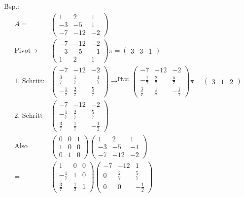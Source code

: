 Bsp.:
\begin{align*}
A= 
&\begin{pmatrix}
1  &  2  & 1 \\
-3 & -5  & 1 \\
-7 & -12 & -2
\end{pmatrix} \\
\text{Pivot} \rightarrow
&\begin{pmatrix}
-7 & -12 & -2 \\
-3 & -5  & -1 \\
1 & 2 & 1
\end{pmatrix}
 \pi = \begin{pmatrix} 3 & 3 & 1\end{pmatrix} \\
\text{1. Schritt:} 
&\begin{pmatrix}
-7           & -12         &           -2 \\
\frac{3}{7}  & \frac{1}{7} & -\frac{1}{7} \\
-\frac{1}{7} & \frac{2}{7} & \frac{5}{7}  
\end{pmatrix}
\rightarrow^{\text{Pivot}}
\begin{pmatrix}
-7           & -12         &           -2  \\
-\frac{1}{7} & \frac{2}{7} &  \frac{5}{7}  \\
\frac{3}{7}  & \frac{1}{7} & -\frac{1}{7} 
\end{pmatrix} 
 \pi = \begin{pmatrix} 3 & 1 & 2 \end{pmatrix} \\
\text{2. Schritt}
&\begin{pmatrix}
-7           & -12         &          -2  \\
-\frac{1}{7} & \frac{2}{7} &  \frac{5}{7} \\
\frac{3}{7}  & \frac{1}{7} & -\frac{1}{2} 
\end{pmatrix} \\
\text{Also}
&\begin{pmatrix}
0 & 0 & 1\\
1 & 0 & 0\\
0 & 1 & 0
\end{pmatrix} 
\begin{pmatrix}
1  &   2 &  1 \\
-3 &  -5 & -1 \\
-7 & -12 & -2 
\end{pmatrix} \\
=
&\begin{pmatrix}
           1 &           0 & 0 \\
-\frac{1}{7} &           1 & 0 \\
 \frac{3}{7} & \frac{1}{2} & 1
\end{pmatrix} 
\begin{pmatrix}
-7 &         -12 &           1 \\
 0 & \frac{2}{7} &  \frac{5}{7}\\
 0 &          0  & -\frac{1}{2}
\end{pmatrix}
\end{align*}

